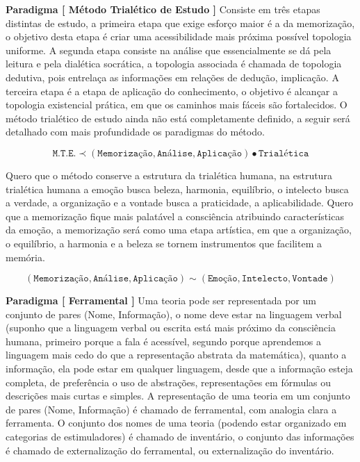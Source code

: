 % 
\hspace{\baselineskip}

\textbf{Paradigma [ Método Trialético de Estudo ]} Consiste em três etapas distintas de estudo, a primeira etapa que exige esforço maior é a da memorização, o objetivo desta etapa é criar uma acessibilidade mais próxima possível topologia uniforme. A segunda etapa consiste na análise que essencialmente se dá pela leitura e pela dialética socrática, a topologia associada é chamada de topologia dedutiva, pois entrelaça as informações em relações de dedução, implicação. A terceira etapa é a etapa de aplicação do conhecimento, o objetivo é alcançar a topologia existencial prática, em que os caminhos mais fáceis são fortalecidos. O método trialético de estudo ainda não está completamente definido, a seguir será detalhado com mais profundidade os paradigmas do método.

$$ \texttt{M.T.E.} \prec ( \texttt{Memorização}, \texttt{Análise} , \texttt{Aplicação} ) \bullet \texttt{Trialética}$$

\hspace{\baselineskip}

Quero que o método conserve a estrutura da trialética humana, na estrutura trialética humana a emoção busca beleza, harmonia, equilíbrio, o intelecto busca a verdade, a organização e a vontade busca a praticidade, a aplicabilidade. Quero que a memorização fique mais palatável a consciência atribuindo características da emoção, a memorização será como uma etapa artística, em que a organização, o equilíbrio, a harmonia e a beleza se tornem instrumentos que facilitem a memória.

$$ (\texttt{Memorização}, \texttt{Análise}, \texttt{Aplicação}) \sim (\texttt{Emoção}, \texttt{Intelecto}, \texttt{Vontade}) $$

\hspace{\baselineskip}

% 

\textbf{Paradigma [ Ferramental ]} Uma teoria pode ser representada por um conjunto de pares (Nome, Informação), o nome deve estar na linguagem verbal (suponho que a linguagem verbal ou escrita está mais próximo da consciência humana, primeiro porque a fala é acessível, segundo porque aprendemos a linguagem mais cedo do que a representação abstrata da matemática), quanto a informação, ela pode estar em qualquer linguagem, desde que a informação esteja completa, de preferência o uso de abstrações, representações em fórmulas ou descrições mais curtas e simples. A representação de uma teoria em um conjunto de pares (Nome, Informação) é chamado de ferramental, com analogia clara a ferramenta. O conjunto dos nomes de uma teoria (podendo estar organizado em categorias de estimuladores) é chamado de inventário, o conjunto das informações é chamado de externalização do ferramental, ou externalização do inventário.

